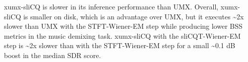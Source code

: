 \documentclass[report.tex]{subfiles}
\begin{document}
xumx-sliCQ is slower in its inference performance than UMX. Overall, xumx-sliCQ is smaller on disk, which is an advantage over UMX, but it executes \textasciitilde2x slower than UMX with the STFT-Wiener-EM step while producing lower BSS metrics in the music demixing task. xumx-sliCQ with the sliCQT-Wiener-EM step is \textasciitilde2x slower than with the STFT-Wiener-EM step for a small \textasciitilde0.1 dB boost in the median SDR score.
\end{document}
